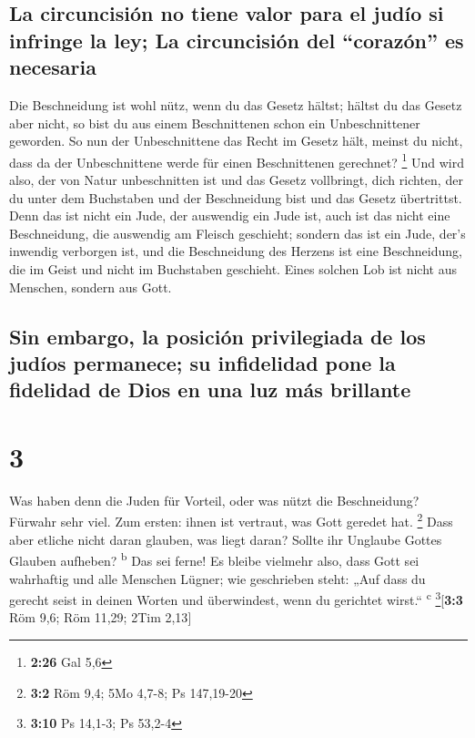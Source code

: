 \hypertarget{la-circuncisiuxf3n-no-tiene-valor-para-el-juduxedo-si-infringe-la-ley-la-circuncisiuxf3n-del-corazuxf3n-es-necesaria}{%
\subsection{La circuncisión no tiene valor para el judío si infringe la
ley; La circuncisión del ``corazón'' es
necesaria}\label{la-circuncisiuxf3n-no-tiene-valor-para-el-juduxedo-si-infringe-la-ley-la-circuncisiuxf3n-del-corazuxf3n-es-necesaria}}

 Die Beschneidung ist wohl nütz, wenn du das Gesetz
hältst; hältst du das Gesetz aber nicht, so bist du aus einem
Beschnittenen schon ein Unbeschnittener geworden.  So nun
der Unbeschnittene das Recht im Gesetz hält, meinst du nicht, dass da
der Unbeschnittene werde für einen Beschnittenen gerechnet? \footnote{\textbf{2:26}
  Gal 5,6}  Und wird also, der von Natur unbeschnitten
ist und das Gesetz vollbringt, dich richten, der du unter dem Buchstaben
und der Beschneidung bist und das Gesetz übertrittst. 
Denn das ist nicht ein Jude, der auswendig ein Jude ist, auch ist das
nicht eine Beschneidung, die auswendig am Fleisch geschieht;
 sondern das ist ein Jude, der's inwendig verborgen ist,
und die Beschneidung des Herzens ist eine Beschneidung, die im Geist und
nicht im Buchstaben geschieht. Eines solchen Lob ist nicht aus Menschen,
sondern aus Gott.

\hypertarget{sin-embargo-la-posiciuxf3n-privilegiada-de-los-juduxedos-permanece-su-infidelidad-pone-la-fidelidad-de-dios-en-una-luz-muxe1s-brillante}{%
\subsection{Sin embargo, la posición privilegiada de los judíos
permanece; su infidelidad pone la fidelidad de Dios en una luz más
brillante}\label{sin-embargo-la-posiciuxf3n-privilegiada-de-los-juduxedos-permanece-su-infidelidad-pone-la-fidelidad-de-dios-en-una-luz-muxe1s-brillante}}

\hypertarget{section-2}{%
\section{3}\label{section-2}}

 Was haben denn die Juden für Vorteil, oder was nützt die
Beschneidung?  Fürwahr sehr viel. Zum ersten: ihnen ist
vertraut, was Gott geredet hat. \footnote{\textbf{3:2} Röm 9,4; 5Mo
  4,7-8; Ps 147,19-20}  Dass aber etliche nicht daran
glauben, was liegt daran? Sollte ihr Unglaube Gottes Glauben aufheben?
\textsuperscript{b}  Das sei ferne! Es bleibe vielmehr
also, dass Gott sei wahrhaftig und alle Menschen Lügner; wie geschrieben
steht: „Auf dass du gerecht seist in deinen Worten und überwindest, wenn
du gerichtet wirst.`` \textsuperscript{c} \footnote{\textbf{3:10} Ps
  14,1-3; Ps 53,2-4}{[}\textbf{3:3} Röm 9,6; Röm 11,29; 2Tim 2,13{]}

